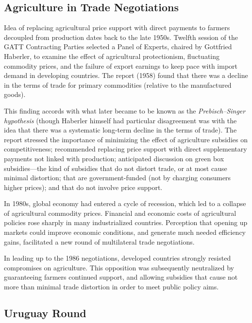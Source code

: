 \documentclass[
  oneside]{book}
\begin{document}
\hypertarget{agriculture-in-trade-negotiations}{%
\subsection{Agriculture in Trade Negotiations}\label{agriculture-in-trade-negotiations}}

Idea of replacing agricultural price support with direct payments to farmers decoupled from production dates back to the late 1950s. Twelfth session of the GATT Contracting Parties selected a Panel of Experts, chaired by Gottfried Haberler, to examine the effect of agricultural protectionism, fluctuating commodity prices, and the failure of export earnings to keep pace with import demand in developing countries. The report (1958) found that there was a decline in the terms of trade for primary commodities (relative to the manufactured goods).

This finding accords with what later became to be known as the \emph{Prebisch--Singer hypothesis} (though Haberler himself had particular disagreement was with the idea that there was a systematic long-term decline in the terms of trade). The report stressed the importance of minimizing the effect of agriculture subsidies on competitiveness; recommended replacing price support with direct supplementary payments not linked with production; anticipated discussion on green box subsidies---the kind of subsidies that do not distort trade, or at most cause minimal distortion; that are government-funded (not by charging consumers higher prices); and that do not involve price support.

In 1980s, global economy had entered a cycle of recession, which led to a collapse of agricultural commodity prices. Financial and economic costs of agricultural policies rose sharply in many industrialized countries. Perception that opening up markets could improve economic conditions, and generate much needed efficiency gains, facilitated a new round of multilateral trade negotiations.

In leading up to the 1986 negotiations, developed countries strongly resisted compromises on agriculture. This opposition was subsequently neutralized by guaranteeing farmers continued support, and allowing subsidies that cause not more than minimal trade distortion in order to meet public policy aims.

\hypertarget{uruguay-round}{%
\subsection{Uruguay Round}\label{uruguay-round}}
\end{document}
